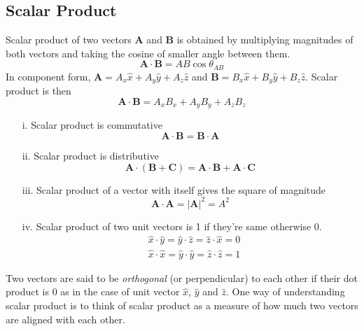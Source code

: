 \documentclass[12pt,a4paper]{article}
\begin{document}
\subsection{Scalar Product}
Scalar product of two vectors \textbf{A} and \textbf{B} is obtained by multiplying magnitudes of both vectors and taking the cosine of smaller angle between them.
\begin{equation}
\textbf{A}\cdot \textbf{B}=AB\cos\theta_{AB}
\end{equation}
In component form, $\textbf{A}=A_x\hat x+A_y\hat y+A_z\hat z$ and $\textbf{B}=B_x\hat x+B_y\hat y+B_z\hat z$. Scalar product is then
\begin{equation}
\textbf{A}\cdot \textbf{B}=A_xB_x+A_yB_y+A_zB_z
\end{equation}
\begin{itemize}
\item[i.] Scalar product is commutative
\begin{equation*}
\textbf{A}\cdot \textbf{B}=\textbf{B}\cdot \textbf{A}
\end{equation*}
\item[ii.] Scalar product is distributive
\begin{equation*}
\textbf{A}\cdot (\textbf{B}+\textbf{C})=\textbf{A}\cdot \textbf{B}+\textbf{A}\cdot \textbf{C}
\end{equation*}
\item[iii.] Scalar product of a vector with itself gives the square of magnitude
\begin{equation*}
\textbf{A}\cdot \textbf{A}=|\textbf{A}|^2=A^2
\end{equation*}
\item[iv.] Scalar product of two unit vectors is 1 if they're same otherwise 0.
\begin{equation*}
\begin{split}
&\hat x\cdot\hat y=\hat y\cdot\hat z=\hat z\cdot\hat x=0\\
&\hat x\cdot\hat x=\hat y\cdot\hat y=\hat z\cdot\hat z=1
\end{split}
\end{equation*}
\end{itemize}
Two vectors are said to be \textit{orthogonal} (or perpendicular) to each other if their dot product is 0 as in the case of unit vector $\hat x$, $\hat y$ and $\hat z$. One way of understanding scalar product is to think of scalar product as a measure of how much two vectors are aligned with each other.
\end{document}
